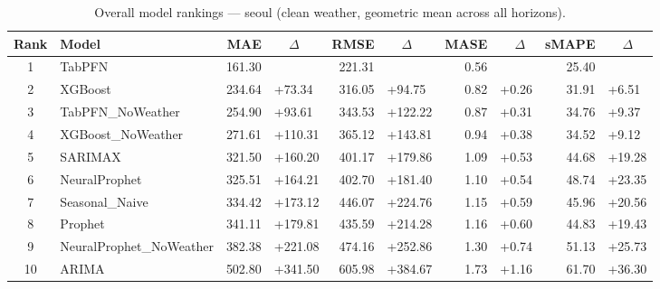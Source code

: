 \begin{table}[ht!]
\centering
\caption{Overall model rankings — seoul (clean weather, geometric mean across all horizons).}
\label{tab:overall_rankings_seoul}
{\small
\setlength{\tabcolsep}{3pt}
\scriptsize
\begin{tabular}{clrlrlrlrl}
\toprule
Rank & Model & MAE & ~~\(\Delta\) & RMSE & ~~\(\Delta\) & MASE & ~~\(\Delta\) & sMAPE & ~~\(\Delta\) \\
\midrule
1 & TabPFN & 161.30 &  & 221.31 &  & 0.56 &  & 25.40 &  \\
2 & XGBoost & 234.64 & +73.34 & 316.05 & +94.75 & 0.82 & +0.26 & 31.91 & +6.51 \\
3 & TabPFN\_NoWeather & 254.90 & +93.61 & 343.53 & +122.22 & 0.87 & +0.31 & 34.76 & +9.37 \\
4 & XGBoost\_NoWeather & 271.61 & +110.31 & 365.12 & +143.81 & 0.94 & +0.38 & 34.52 & +9.12 \\
5 & SARIMAX & 321.50 & +160.20 & 401.17 & +179.86 & 1.09 & +0.53 & 44.68 & +19.28 \\
6 & NeuralProphet & 325.51 & +164.21 & 402.70 & +181.40 & 1.10 & +0.54 & 48.74 & +23.35 \\
7 & Seasonal\_Naive & 334.42 & +173.12 & 446.07 & +224.76 & 1.15 & +0.59 & 45.96 & +20.56 \\
8 & Prophet & 341.11 & +179.81 & 435.59 & +214.28 & 1.16 & +0.60 & 44.83 & +19.43 \\
9 & NeuralProphet\_NoWeather & 382.38 & +221.08 & 474.16 & +252.86 & 1.30 & +0.74 & 51.13 & +25.73 \\
10 & ARIMA & 502.80 & +341.50 & 605.98 & +384.67 & 1.73 & +1.16 & 61.70 & +36.30 \\
\bottomrule
\end{tabular}
}
\end{table}
